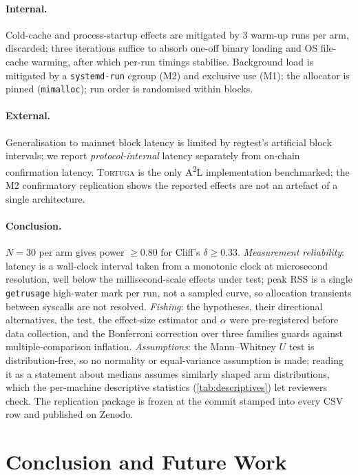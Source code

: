 \documentclass[sigconf,nonacm]{acmart}
\newcommand{\toolname}{\textsc{Tortuga}\xspace}
\newcommand{\atwol}{A\textsuperscript{2}L\xspace}
\newcommand{\code}[1]{\texttt{\small #1}}
\begin{document}
\paragraph*{Internal.}
Cold-cache and process-startup effects are mitigated by 3 warm-up runs per
arm, discarded; three iterations suffice to absorb one-off binary loading
and OS file-cache warming, after which per-run timings stabilise. Background
load is mitigated by a \code{systemd-run} cgroup (M2) and exclusive use
(M1); the allocator is pinned (\code{mimalloc}); run order is randomised
within blocks.

\paragraph*{External.}
Generalisation to mainnet block latency is limited by regtest's artificial
block intervals; we report \emph{protocol-internal} latency separately from
on-chain confirmation latency. \toolname is the only \atwol implementation
benchmarked; the M2 confirmatory replication shows the reported effects are
not an artefact of a single architecture.

\paragraph*{Conclusion.}
$N=30$ per arm gives power $\geq 0.80$ for Cliff's $\delta \geq 0.33$.
\emph{Measurement reliability}: latency is a wall-clock interval taken from
a monotonic clock at microsecond resolution, well below the
millisecond-scale effects under test; peak RSS is a single \code{getrusage}
high-water mark per run, not a sampled curve, so allocation transients
between syscalls are not resolved. \emph{Fishing}: the hypotheses, their
directional alternatives, the test, the effect-size estimator and $\alpha$
were pre-registered before data collection, and the Bonferroni correction
over three families guards against multiple-comparison inflation.
\emph{Assumptions}: the Mann--Whitney $U$ test is distribution-free, so no
normality or equal-variance assumption is made; reading it as a statement
about medians assumes similarly shaped arm distributions, which the
per-machine descriptive statistics (\cref{tab:descriptives}) let reviewers
check. The replication package is frozen at the commit stamped into every
CSV row and published on Zenodo.

\section{Conclusion and Future Work}
\label{sec:conclusion}
\end{document}
